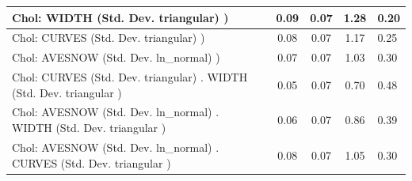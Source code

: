 \begin{table}
\begin{center}
\begin{tabular}{|l|l|c|c|c|l|}
			\hline
			 Chol: WIDTH (Std. Dev. triangular) ) &  & 0.09 & 0.07 & 1.28 & 0.20 \\
			\hline
			 Chol: CURVES (Std. Dev. triangular) ) &  & 0.08 & 0.07 & 1.17 & 0.25 \\
			\hline
			 Chol: AVESNOW (Std. Dev. ln_normal) ) &  & 0.07 & 0.07 & 1.03 & 0.30 \\
			\hline
			 Chol: CURVES (Std. Dev. triangular) . WIDTH (Std. Dev.   triangular ) &  & 0.05 & 0.07 & 0.70 & 0.48 \\
			\hline
			 Chol: AVESNOW (Std. Dev. ln_normal) . WIDTH (Std. Dev.   triangular ) &  & 0.06 & 0.07 & 0.86 & 0.39 \\
			\hline
			 Chol: AVESNOW (Std. Dev. ln_normal) . CURVES (Std. Dev.   triangular ) &  & 0.08 & 0.07 & 1.05 & 0.30 \\
			\hline
		\end{tabular}
	\end{center}
\end{table}